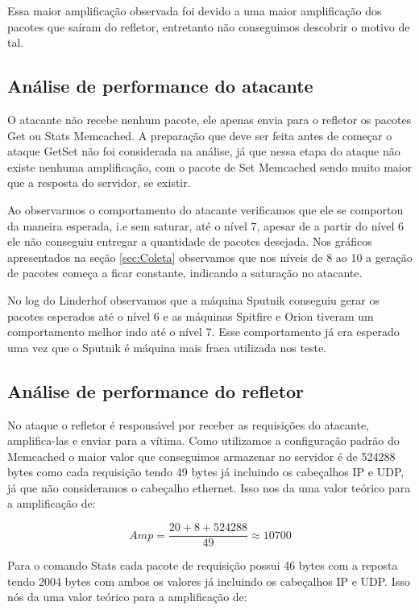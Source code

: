 Essa maior amplificação observada foi devido a uma maior amplificação dos pacotes que saíram do refletor, entretanto não conseguimos descobrir o motivo de tal.


\subsection{Análise de performance do atacante}

O atacante não recebe nenhum pacote, ele apenas envia para o refletor os pacotes Get ou Stats Memcached. A preparação que deve ser feita antes de começar o ataque GetSet não foi considerada na análise, já que nessa etapa do ataque não existe nenhuma amplificação, com o pacote de Set Memcached sendo muito maior que a resposta do servidor, se existir.

Ao observarmos o comportamento do atacante verificamos que ele se comportou da maneira esperada, i.e sem saturar, até o nível 7, apesar de a partir do nível 6 ele não conseguiu entregar a quantidade de pacotes desejada. Nos gráficos apresentados na seção \ref{sec:Coleta} observamos que nos níveis de 8 ao 10 a geração de pacotes começa a ficar constante, indicando a saturação no atacante. 

No log do Linderhof observamos que a máquina Sputnik conseguiu gerar os pacotes esperados até o nível 6 e as máquinas Spitfire e Orion tiveram um comportamento melhor indo até o nível 7. Esse comportamento já era esperado uma vez que o Sputnik é máquina mais fraca utilizada nos teste.

\subsection{Análise de performance do refletor}

No ataque o refletor é responsável por receber as requisições do atacante, amplifica-las e enviar para a vítima. Como utilizamos a configuração padrão do Memcached o maior valor que conseguimos armazenar no servidor é de 524288 bytes como cada requisição tendo 49 bytes já incluindo os cabeçalhos IP e UDP, já que não consideramos o cabeçalho ethernet. Isso nos da uma valor teórico para a amplificação de:

\begin{equation}
Amp = \frac{20 + 8 + 524288}{49} \approx 10700
\label{cal:Fator_Memcached2}
\end{equation}

Para o comando Stats cada pacote de requisição possui 46 bytes com a reposta tendo 2004 bytes com ambos os valores já incluindo os cabeçalhos IP e UDP. Isso nós da uma valor teórico para a amplificação de:

